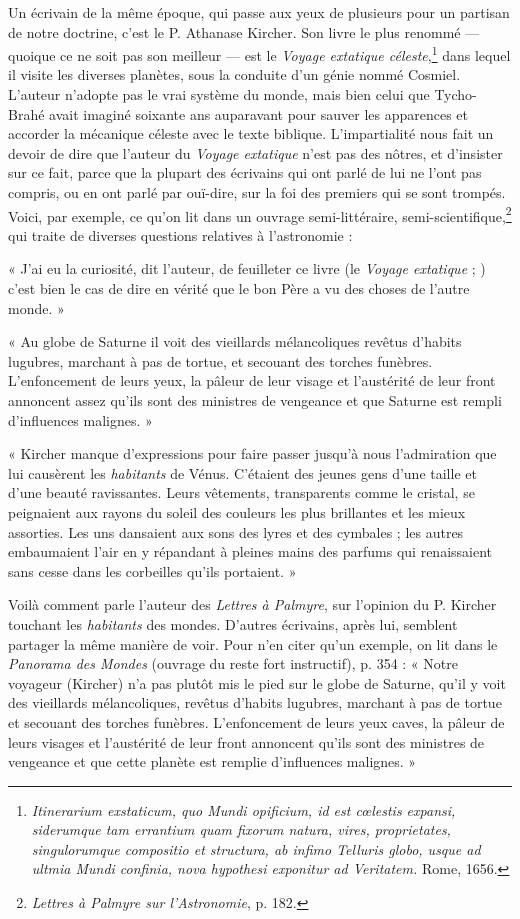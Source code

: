 \documentclass[a4paper, 11pt, oneside, landscape]{article}
\begin{document}
Un écrivain de la même époque, qui passe aux yeux de plusieurs pour un partisan de notre doctrine, c'est le P. Athanase Kircher. Son livre le plus renommé --- quoique ce ne soit pas son meilleur --- est le \emph{Voyage extatique céleste},\footnote{\emph{Itinerarium exstaticum, quo Mundi opificium, id est cœlestis expansi, siderumque tam errantium quam fixorum natura, vires, proprietates, singulorumque compositio et structura, ab infimo Telluris globo, usque ad ultmia Mundi confinia, nova hypothesi exponitur ad Veritatem.} Rome, 1656.} dans lequel il visite les diverses planètes, sous la conduite d'un génie nommé Cosmiel. L'auteur n'adopte pas le vrai système du monde, mais bien celui que Tycho-Brahé avait imaginé soixante ans auparavant pour sauver les apparences et accorder la mécanique céleste avec le texte biblique. L'impartialité nous fait un devoir de dire que l'auteur du \emph{Voyage extatique} n'est pas des nôtres, et d'insister sur ce fait, parce que la plupart des écrivains qui ont parlé de lui ne l'ont pas compris, ou en ont parlé par ouï-dire, sur la foi des premiers qui se sont trompés. Voici, par exemple, ce qu'on lit dans un ouvrage semi-littéraire, semi-scientifique,\footnote{\emph{Lettres à Palmyre sur l'Astronomie}, p. 182.} qui traite de diverses questions relatives à l'astronomie :

« J'ai eu la curiosité, dit l'auteur, de feuilleter ce livre (le \emph{Voyage extatique} ; ) c'est bien le cas de dire en vérité que le bon Père a vu des choses de l'autre monde. »

« Au globe de Saturne il voit des vieillards mélancoliques revêtus d'habits lugubres, marchant à pas de tortue, et secouant des torches funèbres. L'enfoncement de leurs yeux, la pâleur de leur visage et l'austérité de leur front annoncent assez qu'ils sont des ministres de vengeance et que Saturne est rempli d'influences malignes. »

« Kircher manque d'expressions pour faire passer jusqu'à nous l'admiration que lui causèrent les \emph{habitants} de Vénus. C'étaient des jeunes gens d'une taille et d'une beauté ravissantes. Leurs vêtements, transparents comme le cristal, se peignaient aux rayons du soleil des couleurs les plus brillantes et les mieux assorties. Les uns dansaient aux sons des lyres et des cymbales ; les autres embaumaient l'air en y répandant à pleines mains des parfums qui renaissaient sans cesse dans les corbeilles qu'ils portaient. »

Voilà comment parle l'auteur des \emph{Lettres à Palmyre}, sur l'opinion du P. Kircher touchant les \emph{habitants} des mondes. D'autres écrivains, après lui, semblent partager la même manière de voir. Pour n'en citer qu'un exemple, on lit dans le \emph{Panorama des Mondes} (ouvrage du reste fort instructif), p. 354 : « Notre voyageur (Kircher) n'a pas plutôt mis le pied sur le globe de Saturne, qu'il y voit des vieillards mélancoliques, revêtus d'habits lugubres, marchant à pas de tortue et secouant des torches funèbres. L'enfoncement de leurs yeux caves, la pâleur de leurs visages et l'austérité de leur front annoncent qu'ils sont des ministres de vengeance et que cette planète est remplie d'influences malignes. »
\end{document}
